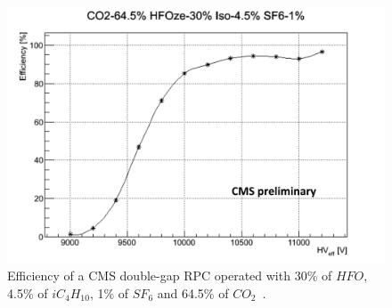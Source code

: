 	\begin{figure}[H]
		\centering
		\includegraphics[width=.6\linewidth]{fig/chapt4/HFO-UGent.png}
		\caption{\label{fig:UGent-HFO} Efficiency of a CMS double-gap RPC operated with 30\% of $HFO$, 4.5\% of $iC_4H_{10}$, 1\% of $SF_6$ and 64.5\% of $CO_2$~\cite{PICCOLO2016}.}
	\end{figure}

\begingroup\setlength{\intextsep}{5pt}\setlength{\columnsep}{15pt}

